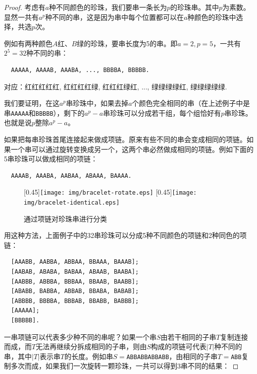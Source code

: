 \documentclass{article}
\begin{document}
\begin{proof}
考虑有$a$种不同颜色的珍珠，我们要串一条长为$p$的珍珠串。其中$p$为素数。显然一共有$a^p$种不同的串，这是因为串中每个位置都可以在$a$种颜色的珍珠中选择，共选$p$次。

例如有两种颜色$A$红、$B$绿的珍珠，要串长度为5的串。即$a = 2, p = 5$，一共有$2^5 = 32$种不同的串：

\begin{verbatim}
  AAAAA, AAAAB, AAABA, ..., BBBBA, BBBBB.
\end{verbatim}

对应：红红红红红, 红红红红绿, 红红红绿红, ..., 绿绿绿绿红, 绿绿绿绿绿.

我们要证明，在这$a^p$串珍珠中，如果去掉$a$个颜色完全相同的串（在上述例子中是串\texttt{AAAAA}和\texttt{BBBBB}），剩下的$a^p - a$串珍珠可以分成若干组，每个组恰好有$p$串珍珠。也就是说$p$整除$a^p - a$。

如果把每串珍珠首尾连接起来做成项链。原来有些不同的串会变成相同的项链。如果一个串可以通过旋转变换成另一个，这两个串必然做成相同的项链。例如下面的5串珍珠可以做成相同的项链：

\begin{verbatim}
  AAAAB, AAABA, AABAA, ABAAA, BAAAA.
\end{verbatim}

\begin{figure}[htbp]
  \centering
  [0.45\linewidth]{\texttt{[image: img/bracelet-rotate.eps]}} \quad
  [0.45\linewidth]{\texttt{[image: img/bracelet-identical.eps]}}
  \caption{通过项链对珍珠串进行分类}
  \label{fig:bracelet}
\end{figure}

用这种方法，上面例子中的32串珍珠可以分成5种不同颜色的项链和2种同色的项链：

\begin{verbatim}
  [AAABB, AABBA, ABBAA, BBAAA, BAAAB];
  [AABAB, ABABA, BABAA, ABAAB, BAABA];
  [AABBB, ABBBA, BBBAA, BBAAB, BAABB];
  [ABABB, BABBA, ABBAB, BBABA, BABAB];
  [ABBBB, BBBBA, BBBAB, BBABB, BABBB];
  [AAAAA];
  [BBBBB].
\end{verbatim}

一串项链可以代表多少种不同的串呢？如果一个串$S$由若干相同的子串$T$复制连接而成，而$T$无法再继续分拆成相同的子串，则由$S$构成的项链可代表$|T|$种不同的串，其中$|T|$表示串$T$的长度。例如串$S=$\texttt{ABBABBABBABB}，由相同的子串$T=$\texttt{ABB}复制多次而成，如果我们一次旋转一颗珍珠，一共可以得到3串不同的结果：


\end{proof}
\end{document}

